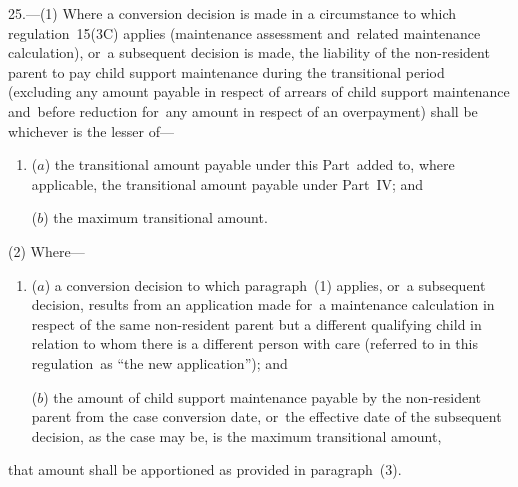 \documentclass[12pt,a4paper]{article}
\begin{document}
25.---(1)  Where a conversion decision is made in a circumstance 
to which regulation~15(3C)  %
applies (maintenance assessment and~related maintenance calculation), or~a subsequent decision is made, the liability of the non-resident parent to pay child support maintenance during the transitional period (excluding any amount payable in respect of arrears of child support maintenance and~before reduction for~any amount in respect of an overpayment) shall be whichever is the lesser of—
\begin{enumerate}\item[]

($a$) the transitional amount payable under this Part~added to, where applicable, the transitional amount payable under Part~IV; and

($b$) the maximum transitional amount.
\end{enumerate}

(2) Where—
\begin{enumerate}\item[]
($a$) a conversion decision to which paragraph~(1) applies, or~a subsequent decision, results from an application made %
for~a maintenance calculation in respect of the same non-resident parent but a different qualifying child in relation to whom there is a different person with care (referred to in this regulation~as “the new application”); and

($b$) the amount of child support maintenance payable by the non-resident parent from the case conversion date, or~the effective date of the subsequent decision, as the case may be, is the maximum transitional amount,
\end{enumerate}
that amount shall be apportioned as provided in paragraph~(3).
\end{document}

